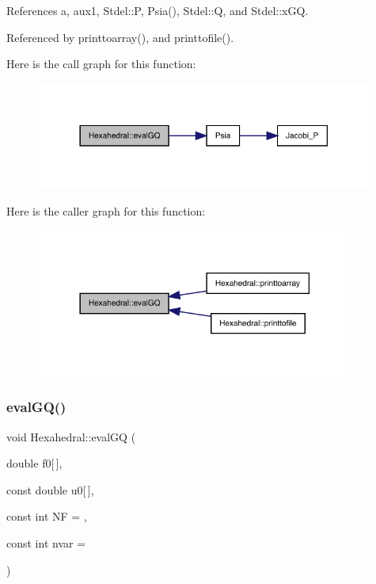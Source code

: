 References a, aux1, Stdel\+::P, Psia(), Stdel\+::Q, and Stdel\+::x\+GQ.



Referenced by printtoarray(), and printtofile().

Here is the call graph for this function\+:
\nopagebreak
\begin{figure}[H]
\begin{center}
\leavevmode
\includegraphics[width=314pt]{classHexahedral_a56081550e866c3e12d0705da7d7908bf_cgraph}
\end{center}
\end{figure}
Here is the caller graph for this function\+:
\nopagebreak
\begin{figure}[H]
\begin{center}
\leavevmode
\includegraphics[width=297pt]{classHexahedral_a56081550e866c3e12d0705da7d7908bf_icgraph}
\end{center}
\end{figure}
\mbox{\label{classHexahedral_a57cb0909590d8f68c7ea9106e4218127}} 
\subsubsection{\texorpdfstring{eval\+G\+Q()}{evalGQ()}\hspace{0.1cm}{\footnotesize\ttfamily [2/2]}}
{\footnotesize\ttfamily void Hexahedral\+::eval\+GQ (\begin{DoxyParamCaption}\item[{double}]{f0\mbox{[}$\,$\mbox{]},  }\item[{const double}]{u0\mbox{[}$\,$\mbox{]},  }\item[{const int}]{NF = {},  }\item[{const int}]{nvar = {} }\end{DoxyParamCaption})\hspace{0.3cm}{\ttfamily [virtual]}}



